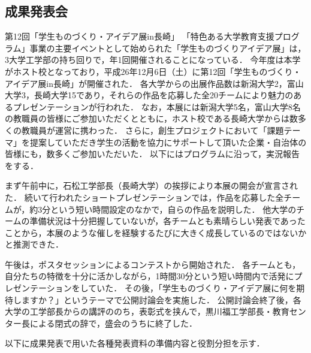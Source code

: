 \subsection{成果発表会}
\par
第12回「学生ものづくり・アイデア展in長崎」
「特色ある大学教育支援プログラム」事業の主要イベントとして始められた「学生ものづくりアイデア展」は，3大学工学部の持ち回りで，年1回開催されることになっている．
今年度は本学がホスト校となっており，平成26年12月6日（土）に第12回「学生ものづくり・アイデア展in長崎」が開催された．
各大学からの出展作品数は新潟大学2，富山大学3，長崎大学15であり，それらの作品を応募した全20チームにより魅力のあるプレゼンテーションが行われた．
なお，本展には新潟大学5名，富山大学8名の教職員の皆様にご参加いただくとともに，ホスト校である長崎大学からは数多くの教職員が運営に携わった．
さらに，創生プロジェクトにおいて「課題テーマ」を提案していただき学生の活動を協力にサポートして頂いた企業・自治体の皆様にも，数多くご参加いただいた．
以下にはプログラムに沿って，実況報告をする．
\par
まず午前中に，石松工学部長（長崎大学）の挨拶により本展の開会が宣言された．
続いて行われたショートプレゼンテーションでは，作品を応募した全チームが，約3分という短い時間設定のなかで，自らの作品を説明した．
他大学のチームの準備状況は十分把握していないが，各チームとも素晴らしい発表であったことから，本展のような催しを経験するたびに大きく成長しているのではないかと推測できた．
\par
午後は，ポスタセッションによるコンテストから開始された．
各チームとも，自分たちの特徴を十分に活かしながら，1時間30分という短い時間内で活発にプレゼンテーションをしていた．
その後，「学生ものづくり・アイデア展に何を期待しますか？」というテーマで公開討論会を実施した．
公開討論会終了後，各大学の工学部長からの講評ののち，表彰式を挟んで，黒川福工学部長・教育センター長による閉式の辞で，盛会のうちに終了した．
\par
以下に成果発表で用いた各種発表資料の準備内容と役割分担を示す．
